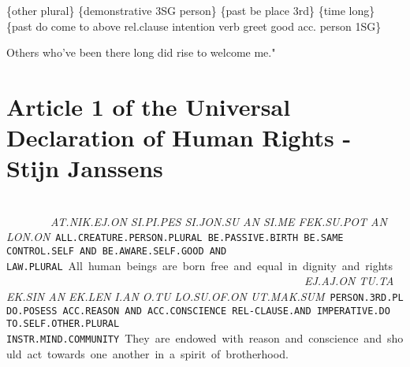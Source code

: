 {\{other plural\} \{demonstrative 3SG person\} \{past be place 3rd\} \{time long\} \{past do come to above rel.clause intention verb greet good acc. person 1SG\}

Others who’ve been there long did rise to welcome me." 

\section{Article 1 of the Universal Declaration of Human Rights - Stijn Janssens}

\at\nik\ej\on\ \  \si\Atlanpi\pes\ \  \si\jon\su\ \  \an\ \ \si\me\ \  \fek\su\pot\ \\  \an\ \  \lon\on


{\it AT.NIK.EJ.ON SI.PI.PES SI.JON.SU AN SI.ME FEK.SU.POT AN LON.ON}

{\tt ALL.CREATURE.PERSON.PLURAL BE.PASSIVE.BIRTH BE.SAME \\CONTROL.SELF AND BE.AWARE.SELF.GOOD AND LAW.PLURAL}

All human beings are born free and equal in dignity and rights


\vspace{1.5cm}


\ej\aj\on\ \ \tu\ta\ \ \ek\Atlansin\ \ \an\ \ \ek\len\ \ \Atlani\an\ \ \Atlano\tu\ \ \lo\su\of\on\ \ \ut\mak\Atlansum

{\it EJ.AJ.ON TU.TA EK.SIN AN EK.LEN I.AN O.TU LO.SU.OF.ON UT.MAK.SUM}

{\tt  PERSON.3RD.PL DO.POSESS ACC.REASON AND ACC.CONSCIENCE REL-CLAUSE.AND IMPERATIVE.DO TO.SELF.OTHER.PLURAL \\INSTR.MIND.COMMUNITY}

They are endowed with reason and conscience and should act towards one another in a spirit of brotherhood.






}



